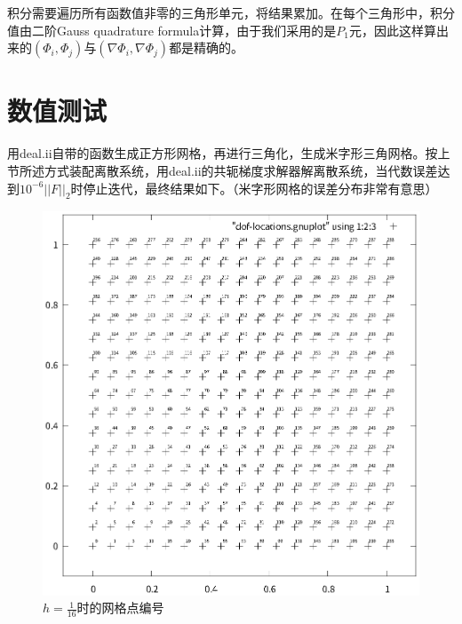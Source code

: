 \documentclass[lang=cn,11pt,a4paper]{elegantpaper}
\begin{document}
积分需要遍历所有函数值非零的三角形单元，将结果累加。在每个三角形中，积分值由二阶Gauss quadrature formula计算，由于我们采用的是$P_1$元，因此这样算出来的$(\Phi_i,\Phi_j)$与$(\nabla \Phi_i, \nabla \Phi_j)$都是精确的。

\section{数值测试}

用deal.ii自带的函数生成正方形网格，再进行三角化，生成米字形三角网格。按上节所述方式装配离散系统，用deal.ii的共轭梯度求解器解离散系统，当代数误差达到$10^{-6}||F||_2$时停止迭代，最终结果如下。（米字形网格的误差分布非常有意思）

\begin{figure}[H]
    \centering
    \begin{minipage}[t]{0.4\textwidth}
        \centering
        \includegraphics[width=0.9\linewidth]{fig/dof-locations.eps}
        \caption{$h=\frac{1}{16}$时的网格点编号}
    \end{minipage}
    \hspace{1em}
    \begin{minipage}[t]{0.4\textwidth}
        \centering

\end{minipage}
\end{figure}
\end{document}
